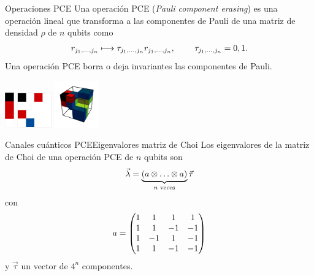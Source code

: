 \documentclass[xcolor=dvipsnames,presentation]{beamer}%
\begin{document}
\begin{frame}{Operaciones PCE}
	Una operación PCE (\textit{Pauli component erasing}) 
	es una operación lineal que transforma a las 	componentes 
	de Pauli de una matriz de densidad $\rho$ de $n$ qubits como
	\begin{align*}
	r_{j_1,\ldots,j_n}\longmapsto \tau_{j_1,\ldots,j_n}r_{j_1,\ldots,j_n},
	\hspace{.8cm}\tau_{j_1,\ldots,j_n}=0,1.
	\end{align*}
	Una operación PCE borra o deja invariantes las componentes de Pauli. 
	
	\hfill
	\includegraphics[height=1.5cm]{1qubit_pce_01}
	\hspace{1.8cm}
	\includegraphics[height=1.5cm]{2qubit_pce_01}
	\hfill
	\includegraphics[height=2cm]{3qubit_pce_01}
	\hspace{1cm} 

	\vfill	
	
\end{frame}


\begin{frame}{Canales cuánticos PCE}{Eigenvalores matriz de Choi} 
Los eigenvalores de la matriz de Choi de una operación PCE 
de $n$ qubits son
\begin{align*}
\vec{\lambda} = 
\underbrace{\qty(a\otimes \ldots\otimes a)}_{n\text{ veces}} \vec{\tau}
\end{align*}
con
\begin{align*}
a=\mqty(1&1&1&1\\1&1&-1&-1\\1&-1&1&-1\\1&1&-1&-1)
\end{align*}
y $\vec{\tau}$ un vector de $4^n$ componentes.
\end{frame}
\end{document}
